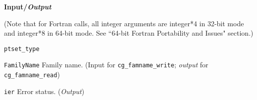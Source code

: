 \noindent
\textbf{\textcolor{input}{Input}/\textcolor{output}{\textit{Output}}}

\noindent (Note that for Fortran calls, all integer arguments are integer*4 in 32-bit mode and integer*8 in 64-bit mode.
See ``64-bit Fortran Portability and Issues" section.)

\begin{Ventryi}{\texttt{ptset\_type}}\raggedright
\item [\texttt{FamilyName}]
      Family name.
      (\textcolor{input}{Input} for \texttt{cg\_famname\_write};
      \textcolor{output}{\textit{output}} for \texttt{cg\_famname\_read})
\item [\texttt{ier}]
      Error status.
      (\textcolor{output}{\textit{Output}})
\end{Ventryi}
